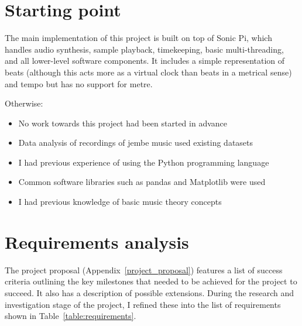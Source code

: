 \documentclass[12pt,twoside,openright]{report}
\begin{document}
\section{Starting point} \label{starting_point}

The main implementation of this project is built on top of Sonic Pi, which
handles audio synthesis, sample playback, timekeeping, basic multi-threading,
and all lower-level software components. It includes a simple representation of
beats (although this acts more as a virtual clock than beats in a metrical sense)
and tempo but has no support for metre.

Otherwise:
\begin{itemize}
	\item No work towards this project had been started in advance
	\item Data analysis of recordings of jembe music used existing datasets
	\item I had previous experience of using the Python programming language
	\item Common software libraries such as pandas and Matplotlib were used
	\item I had previous knowledge of basic music theory concepts
\end{itemize}



\section{Requirements analysis} \label{requirements_analysis}

The project proposal (Appendix~\ref{project_proposal}) features a list of success criteria outlining the
key milestones that needed to be achieved for the project to succeed. It also
has a description of possible extensions. During the research and investigation
stage of the project, I refined these into the list of requirements shown in
Table~\ref{table:requirements}.
\end{document}
